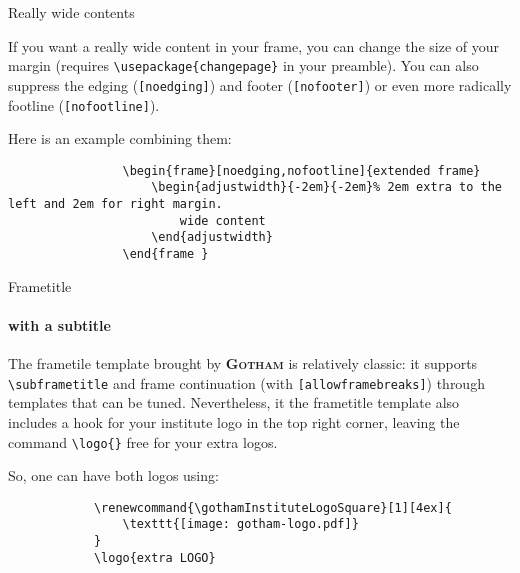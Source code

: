\documentclass[aspectratio=169]{beamer}
\newcommand{\themename}{\textbf{\textsc{Gotham}}}
\begin{document}
	\begin{frame}{Really wide contents}
		\begin{adjustwidth}{-2em}{-2em}
			If you want a really wide content in your frame, you can change the size of your margin (requires \verb|\usepackage{changepage}| in your preamble).
			You can also suppress the edging (\verb|[noedging]|) and footer (\verb|[nofooter]|) or even more radically footline (\verb|[nofootline]|).

			Here is an example combining them: 
			\begin{verbatim}
				\begin{frame}[noedging,nofootline]{extended frame}
					\begin{adjustwidth}{-2em}{-2em}% 2em extra to the left and 2em for right margin.
						wide content
					\end{adjustwidth}
				\end{frame }
			\end{verbatim}
		\end{adjustwidth}
	\end{frame}

	{%
	\renewcommand{\gothamInstituteLogoSquare}[1][4ex]{%
      \texttt{[image: gotham-logo.pdf]}
   }
	\begin{frame}[fragile]{Frametitle}
		\framesubtitle{with a subtitle}
		The frametile template brought by \themename{} is relatively classic: it supports \verb|\subframetitle| and frame continuation (with \verb|[allowframebreaks]|) through templates that can be tuned.
		Nevertheless, it the frametitle template also includes a hook for your institute logo in the top right corner, leaving the command \verb|\logo{}| free for your extra logos.
		
		So, one can have both logos using:
		\begin{verbatim}
			\renewcommand{\gothamInstituteLogoSquare}[1][4ex]{
				\texttt{[image: gotham-logo.pdf]}
			}
			\logo{extra LOGO}
		\end{verbatim}
	\end{frame}
	}
\end{document}
